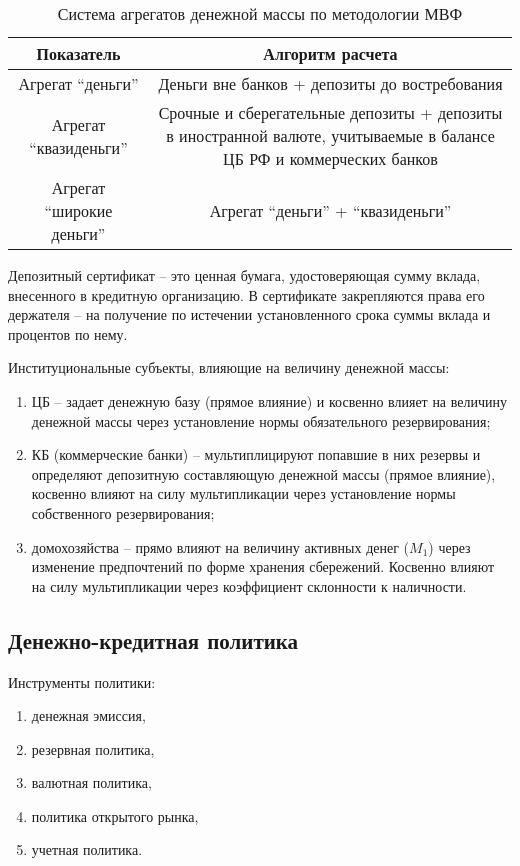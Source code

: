 \begin{table}[h!]
    \center
    \caption{Система агрегатов денежной массы по методологии МВФ}
    \begin{tabular}{|C{.2}|C{.6}|} \hline
        Показатель & Алгоритм расчета \\ \hline
        Агрегат ``деньги'' & Деньги вне банков + депозиты до востребования
        \\ \hline
        Агрегат ``квазиденьги'' & Срочные и сберегательные депозиты + депозиты
        в иностранной валюте, учитываемые в балансе ЦБ РФ и коммерческих банков
        \\ \hline
        Агрегат ``широкие деньги'' & Агрегат ``деньги'' + ``квазиденьги''
        \\ \hline
    \end{tabular}
\end{table}

Депозитный сертификат -- это ценная бумага, удостоверяющая сумму вклада,
внесенного в кредитную организацию. В сертификате закрепляются права его
держателя -- на получение по истечении установленного срока суммы вклада и
процентов по нему.

Институциональные субъекты, влияющие на величину денежной массы:
\begin{enumerate}
    \item ЦБ -- задает денежную базу (прямое влияние) и косвенно влияет на
    величину денежной массы через установление нормы обязательного
    резервирования;
    \item КБ (коммерческие банки) -- мультиплицируют попавшие в них резервы и
    определяют депозитную составляющую денежной массы (прямое влияние),
    косвенно влияют на силу мультипликации через установление нормы
    собственного резервирования;
    \item домохозяйства -- прямо влияют на величину активных денег (\(M_1\))
    через изменение предпочтений по форме хранения сбережений. Косвенно влияют
    на силу мультипликации через коэффициент склонности к наличности.
\end{enumerate}

\subsection{Денежно-кредитная политика}
Инструменты политики:
\begin{enumerate}
    \item денежная эмиссия,
    \item резервная политика,
    \item валютная политика,
    \item политика открытого рынка,
    \item учетная политика.
\end{enumerate}


